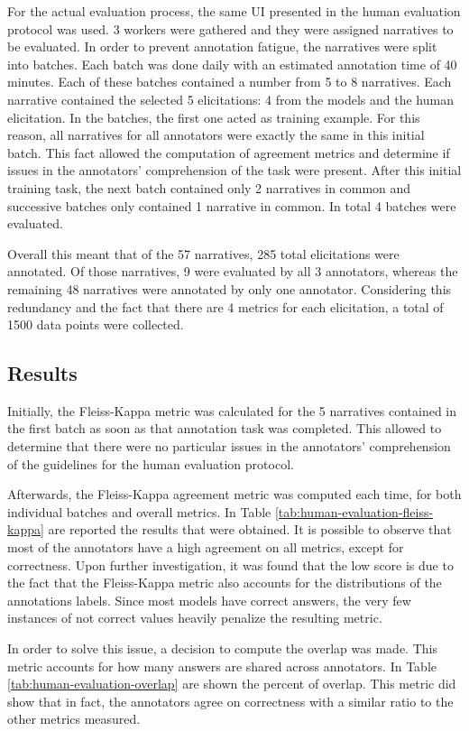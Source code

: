 For the actual evaluation process, the same UI presented in the human evaluation protocol was used. %
3 workers were gathered and they were assigned narratives to be evaluated.  
In order to prevent annotation fatigue, the narratives were split into batches. Each batch was done daily with an estimated annotation time of 40 minutes. Each of these batches contained a number from 5 to 8 narratives. Each narrative contained the selected 5 elicitations: 4 from the models and the human elicitation. In the batches, the first one acted as training example. For this reason, all narratives for all annotators were exactly the same in this initial batch. This fact allowed the computation of agreement metrics and determine if issues in the annotators' comprehension of the task were present. After this initial training task, the next batch contained only 2 narratives in common and successive batches only contained 1 narrative in common. In total 4 batches were evaluated.

Overall this meant that of the 57 narratives, 285 total elicitations were annotated. Of those narratives, 9 were evaluated by all 3 annotators, whereas the remaining 48 narratives were annotated by only one annotator. Considering this redundancy and the fact that there are 4 metrics for each elicitation, a total of 1500 data points were collected.


\subsection{Results}
Initially, the Fleiss-Kappa \cite{fleiss} metric was calculated for the 5 narratives contained in the first batch as soon as that annotation task was completed. This allowed to determine that there were no particular issues in the annotators' comprehension of the guidelines for the human evaluation protocol.


Afterwards, the Fleiss-Kappa agreement metric was computed each time, for both individual batches and overall metrics. In Table \ref{tab:human-evaluation-fleiss-kappa} are reported the results that were obtained. It is possible to observe that most of the annotators have a high agreement on all metrics, except for correctness. Upon further investigation, it was found that the low score is due to the fact that the Fleiss-Kappa metric also accounts for the distributions of the annotations labels. Since most models have correct answers, the very few instances of not correct values heavily penalize the resulting metric.

In order to solve this issue, a decision to compute the overlap was made. This metric accounts for how many answers are shared across annotators. In Table \ref{tab:human-evaluation-overlap} are shown the percent of overlap. This metric did show that in fact, the annotators agree on correctness with a similar ratio to the other metrics measured. 



